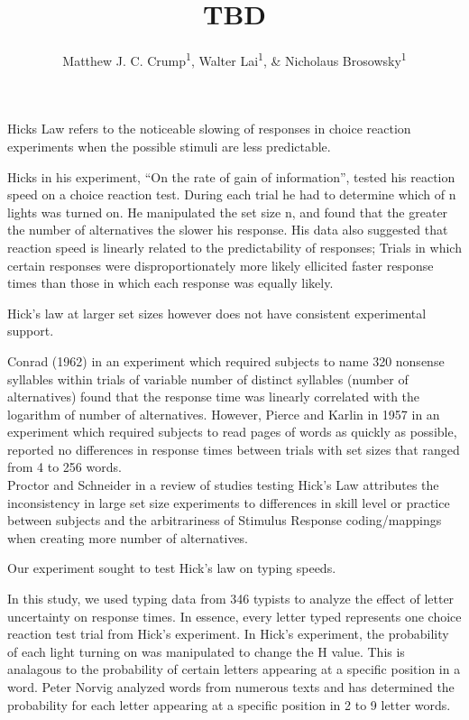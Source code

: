 \documentclass[floatsintext,man]{apa6}
\title{TBD}
\author{Matthew J. C. Crump\textsuperscript{1}, Walter Lai\textsuperscript{1}, \& Nicholaus Brosowsky\textsuperscript{1}}
\affiliation{
    \vspace{0.5cm}
          \textsuperscript{1} Brooklyn College of the City University of New York  }
\theoremstyle{definition}
\theoremstyle{definition}
\theoremstyle{definition}
\theoremstyle{remark}
\begin{document}
\maketitle

\setcounter{secnumdepth}{0}



Hicks Law refers to the noticeable slowing of responses in choice
reaction experiments when the possible stimuli are less predictable.

Hicks in his experiment, \enquote{On the rate of gain of information},
tested his reaction speed on a choice reaction test. During each trial
he had to determine which of n lights was turned on. He manipulated the
set size n, and found that the greater the number of alternatives the
slower his response. His data also suggested that reaction speed is
linearly related to the predictability of responses; Trials in which
certain responses were disproportionately more likely ellicited faster
response times than those in which each response was equally likely.

Hick's law at larger set sizes however does not have consistent
experimental support.

Conrad (1962) in an experiment which required subjects to name 320
nonsense syllables within trials of variable number of distinct
syllables (number of alternatives) found that the response time was
linearly correlated with the logarithm of number of alternatives.
However, Pierce and Karlin in 1957 in an experiment which required
subjects to read pages of words as quickly as possible, reported no
differences in response times between trials with set sizes that ranged
from 4 to 256 words.\\
Proctor and Schneider in a review of studies testing Hick's Law
attributes the inconsistency in large set size experiments to
differences in skill level or practice between subjects and the
arbitrariness of Stimulus Response coding/mappings when creating more
number of alternatives.

Our experiment sought to test Hick's law on typing speeds.

In this study, we used typing data from 346 typists to analyze the
effect of letter uncertainty on response times. In essence, every letter
typed represents one choice reaction test trial from Hick's experiment.
In Hick's experiment, the probability of each light turning on was
manipulated to change the H value. This is analagous to the probability
of certain letters appearing at a specific position in a word. Peter
Norvig analyzed words from numerous texts and has determined the
probability for each letter appearing at a specific position in 2 to 9
letter words.
\end{document}
